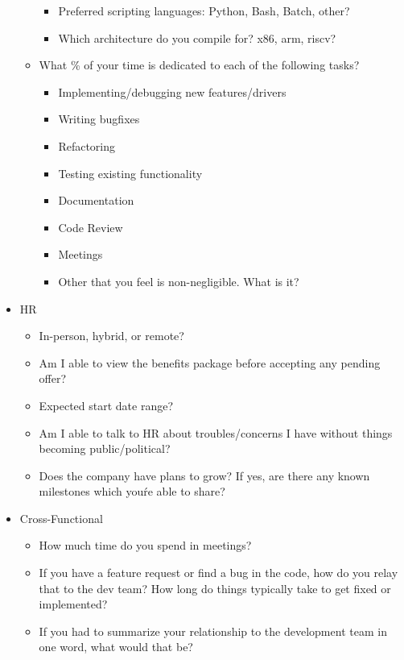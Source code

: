 \documentclass{article}
\begin{document}
\begin{itemize}
\begin{itemize}
\begin{itemize}
			            \item Preferred scripting languages: Python, Bash, Batch, other?
			            \item Which architecture do you compile for? x86, arm, riscv?
		            \end{itemize}
		      \item What \% of your time is dedicated to each of the following tasks?
		            \begin{itemize}
			            \item Implementing/debugging new features/drivers
			            \item Writing bugfixes
			            \item Refactoring
			            \item Testing existing functionality
			            \item Documentation
			            \item Code Review
			            \item Meetings
			            \item Other that you feel is non-negligible. What is it?
		            \end{itemize}
	      \end{itemize}
	\item HR
	      \begin{itemize}
		      \item In-person, hybrid, or remote?
		      \item Am I able to view the benefits package before accepting any pending offer?
		      \item Expected start date range?
		      \item Am I able to talk to HR about troubles/concerns I have without things becoming public/political?
		      \item Does the company have plans to grow? If yes, are there any known milestones which you\'re able to share?
	      \end{itemize}
	\item Cross-Functional
	      \begin{itemize}
		      \item How much time do you spend in meetings?
		      \item If you have a feature request or find a bug in the code, how do you relay that to the dev team? How long do things typically take to get fixed or implemented?
		      \item If you had to summarize your relationship to the development team in one word, what would that be?

\end{itemize}
\end{itemize}
\end{document}
